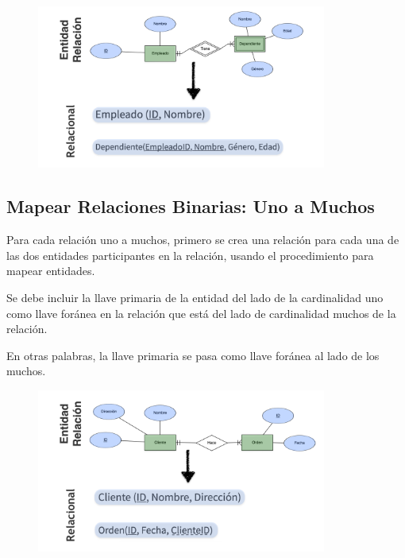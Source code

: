 \documentclass[12pt, fleqn]{report}                             %
\begin{document}
                \begin{figure}[h]
                    \centering
                    \includegraphics[width=0.85\textwidth]{NormalizacionEntidadDebil}
                \end{figure}

                


            \clearpage
            \subsection{Mapear Relaciones Binarias: Uno a Muchos}

                Para cada relación uno a muchos, primero se crea una relación para cada una de las dos
                entidades participantes en la relación, usando el procedimiento para mapear entidades.

                Se debe incluir la llave primaria de la entidad del lado de la cardinalidad uno como llave
                foránea en la relación que está del lado de cardinalidad muchos de la relación.

                En otras palabras, la llave primaria se pasa como llave foránea al lado de los muchos.

                \begin{figure}[h]
                    \centering
                    \includegraphics[width=0.85\textwidth]{NormalizacionRelacionesBinariasUnoMuchos}
                \end{figure}
\end{document}
